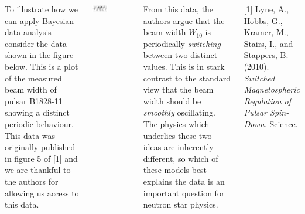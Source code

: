 \documentclass[20pt, a1paper, portrait, margin=0mm, innermargin=8mm,
               blockverticalspace=8mm,colspace=5mm, subcolspace=0mm]
               {tikzposter}
\begin{document}
\begin{columns}
{To illustrate how we can apply Bayesian data analysis consider the data
shown in the figure below. This is a plot of the measured beam width
of pulsar B1828-11 showing a distinct periodic behaviour. This data was 
originally published in figure 5 of [1] and we are thankful
to the authors for allowing us access to this data.
\begin{tikzfigure}
    \centering
    \includegraphics[trim=0mm 3mm 0mm 8mm,clip=true, width=0.4\textwidth]{img/raw_data}
\end{tikzfigure}
From this data, the authors argue that the beam width $W_{10}$ is
periodically \emph{switching}
between two distinct values. This is in stark contrast to the standard view that
the beam width should be \emph{smoothly} oscillating. 
The physics which underlies these two ideas are inherently different, so which
of these models best explains the data is an important question for neutron star physics.

\vspace{5mm}
\small
[1] Lyne, A., Hobbs, G., Kramer, M., Stairs, I., and Stappers, B. (2010). 
\emph{Switched Magnetospheric Regulation of Pulsar Spin-Down.} Science.
}

\end{columns}

\begin{columns}


\end{columns}
\end{document}
